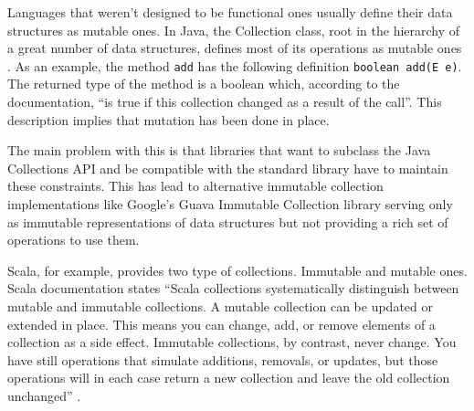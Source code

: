 \documentclass[../main.tex]{subfiles}
\begin{document}
Languages that weren't designed to be functional ones usually define their data
structures as mutable ones. In Java, the Collection class, root in the hierarchy
of a great number of data structures, defines most of its operations as mutable ones
\autocite{Collection}. As an example, the method \texttt{add} has the following definition
\texttt{boolean add(E e)}. The returned type of the method is a boolean which,
according to the documentation, \enquote{is true if this collection changed as a result
of the call}. This description implies that mutation has been done in place.

The main problem with this is that libraries that want to subclass the Java
Collections API and be compatible with the standard library have to maintain
these constraints. This has lead to alternative immutable collection implementations like
Google's Guava Immutable Collection library \autocite{ImmutableCollectionAPI}
serving only as immutable representations of data structures but not providing a
rich set of operations to use them.

Scala, for example, provides two type of collections. Immutable and mutable ones.
Scala documentation states \enquote{Scala collections systematically distinguish between
mutable and immutable collections. A mutable collection can be updated or
extended in place. This means you can change, add, or remove elements of a
collection as a side effect. Immutable collections, by contrast, never change.
You have still operations that simulate additions, removals, or updates, but
those operations will in each case return a new collection and leave the old
collection unchanged} \autocite{MutableDocumentation}.
\end{document}
